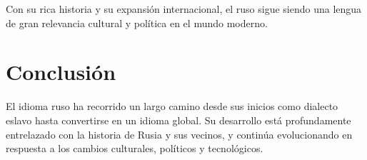 Con su rica historia y su expansión internacional, el ruso sigue siendo una lengua de gran relevancia cultural y política en el mundo moderno.

\section{Conclusión}

El idioma ruso ha recorrido un largo camino desde sus inicios como dialecto eslavo hasta convertirse en un idioma global. Su desarrollo está profundamente entrelazado con la historia de Rusia y sus vecinos, y continúa evolucionando en respuesta a los cambios culturales, políticos y tecnológicos.

